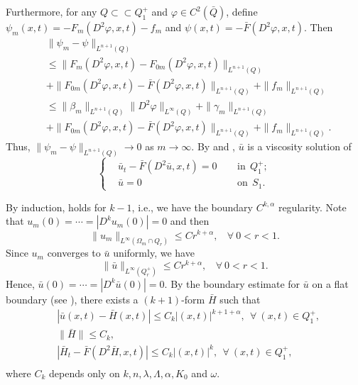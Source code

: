 \documentclass[preprint,12pt]{elsarticle}
\theoremstyle{definition}
\theoremstyle{remark}
\numberwithin{equation}{section}
\begin{document}
Furthermore, for any $Q\subset\subset Q_1^+$ and $\varphi\in C^2(\bar{Q})$, define $\psi_m(x,t)=-F_m(D^2\varphi,x,t)-f_m$ and $\psi(x,t)=-\bar F(D^2\varphi,x,t)$. Then
\begin{equation*}
  \begin{aligned}
&\|\psi_m-\psi\|_{L^{n+1}(Q)}\\
    &\leq \|F_m(D^2\varphi,x,t)-F_{0m}(D^2\varphi,x,t)\|_{L^{n+1}(Q)}\\
    &+\|F_{0m}(D^2\varphi,x,t)-\bar F(D^2\varphi,x,t)\|_{L^{n+1}(Q)}+\|f_m\|_{L^{n+1}(Q)}\\
    &\leq \|\beta_{m}\|_{L^{n+1}(Q)}\|D^2\varphi\|_{L^{\infty}(Q)}+\|\gamma_{m}\|_{L^{n+1}(Q)}\\
    &+\|F_{0m}(D^2\varphi,x,t)-\bar F(D^2\varphi,x,t)\|_{L^{n+1}(Q)}+\|f_m\|_{L^{n+1}(Q)}.
\end{aligned}
\end{equation*}
Thus, $\|\psi_m-\psi\|_{L^{n+1}(Q)}\rightarrow 0$ as $m\rightarrow \infty$. By  and , $\bar u$ is a viscosity solution of
\begin{equation*}
\left\{\begin{aligned}
&\bar u_t-\bar F(D^2\bar u,x,t)=0&& ~~\mbox{in}~~Q_{1}^+;\\
&\bar u=0&& ~~\mbox{on}~~S_{1}.
\end{aligned}\right.
\end{equation*}

By induction,  holds for $k-1$, i.e., we have the boundary $C^{k,\alpha}$ regularity.
Note that $u_m(0)=\cdots=|D^{k}u_m(0)|=0$ and then
\begin{equation*}
\|u_m\|_{L^{\infty }(\Omega_m\cap Q_r)}\leq Cr^{k+\alpha} ,~~~~\forall~0<r<1.
\end{equation*}
Since $u_m$ converges to $\bar u$ uniformly, we have
\begin{equation*}
\|\bar u\|_{L^{\infty }(Q_r^+)}\leq Cr^{k+\alpha}, ~~~~\forall~0<r<1.
\end{equation*}
Hence, $\bar u(0)=\cdots=|D^{k}\bar u(0)|=0$. By the boundary estimate for $\bar u$ on a flat boundary (see ), there exists a $(k+1)$-form $\bar{H}$ such that
\begin{equation}\label{e.cka-5}
\begin{aligned}
  &|\bar u(x,t)-\bar{H}(x,t)|\leq C_k |(x,t)|^{k+1+\alpha}, ~~\forall ~(x,t)\in Q_{1}^+,\\
  &\|\bar{H}\|\leq C_k,\\
  &|\bar{H}_t-\bar F(D^2\bar{H},x,t)|\leq C_k|(x,t)|^{k}, ~~\forall ~(x,t)\in Q_{1}^+,\\
\end{aligned}
\end{equation}
where $C_k$ depends only on $k,n,\lambda,\Lambda,\alpha,K_0$ and $\omega$.
\end{document}
